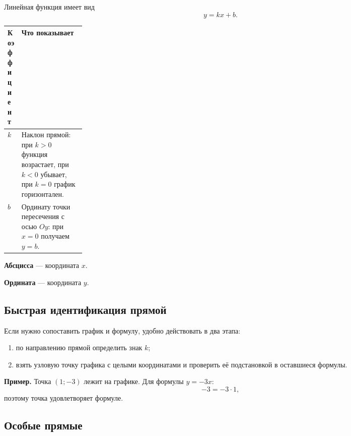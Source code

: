 \documentclass[a4paper,12pt]{article}
\newcommand{\key}[1]{\textcolor{darkaccent}{\textbf{#1}}}
\begin{document}
Линейная функция имеет вид
\[
y=kx+b.
\]

\begin{tabularx}{\linewidth}{@{}>{\bfseries}p{0.18\linewidth}X@{}}
\toprule
Коэффициент & Что показывает \\
\midrule
$k$
&
Наклон прямой:
при $k>0$ функция возрастает,
при $k<0$ убывает,
при $k=0$ график горизонтален.
\\
$b$
&
Ординату точки пересечения с осью $Oy$:
при $x=0$ получаем $y=b$.
\\
\bottomrule
\end{tabularx}

\key{Абсцисса} --- координата $x$.

\key{Ордината} --- координата $y$.

\subsection*{Быстрая идентификация прямой}

Если нужно сопоставить график и формулу, удобно действовать в два этапа:

\begin{enumerate}
  \item по направлению прямой определить знак $k$;
  \item взять узловую точку графика с целыми координатами и проверить её подстановкой в оставшиеся формулы.
\end{enumerate}

\textbf{Пример.}
Точка $(1;-3)$ лежит на графике.
Для формулы $y=-3x$:
\[
-3=-3\cdot1,
\]
поэтому точка удовлетворяет формуле.

\subsection*{Особые прямые}
\end{document}
